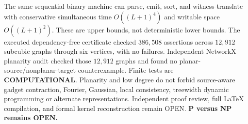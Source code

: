 \documentclass[11pt]{article}
\begin{document}
The same sequential binary machine can parse, emit,
sort, and witness-translate with conservative simultaneous
time $O((L+1)^4)$ and writable space $O((L+1)^2)$.
These are upper bounds, not deterministic lower bounds.
The executed dependency-free certificate checked
$386{,}508$ assertions across $12{,}912$ subcubic
graphs through six vertices, with no failures.
Independent NetworkX planarity audit checked those
$12{,}912$ graphs and found no planar-source/nonplanar-target
counterexample. Finite tests are \textbf{COMPUTATIONAL}.
Planarity and low degree do not forbid source-aware gadget
contraction, Fourier, Gaussian, local consistency,
treewidth dynamic programming or alternate representations.
Independent proof review, full LaTeX compilation, and
formal kernel reconstruction remain OPEN.
\textbf{P versus NP remains OPEN.}
\end{document}
